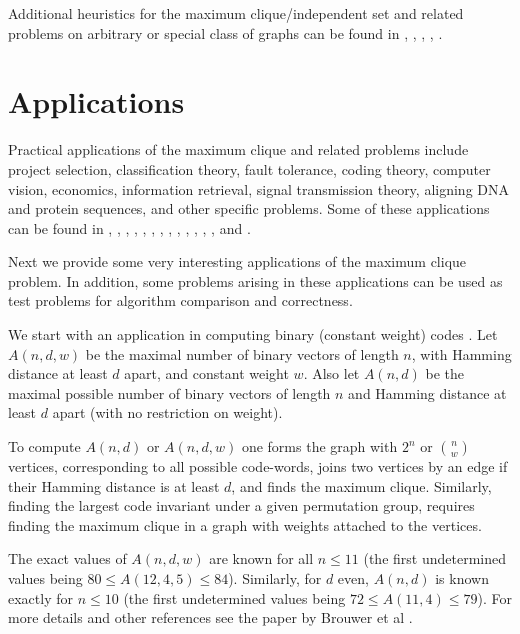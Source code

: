 Additional heuristics for the maximum clique/independent set and
related problems on arbitrary or special class of graphs can be
found in \cite{ChNiSa83}, \cite{ChNa91}, \cite{Chv79},
\cite{FiWo82}, \cite{TaChLeHu90}.

\section{Applications}

Practical applications of the maximum clique and related problems
include project selection, classification theory, fault tolerance,
coding theory, computer vision, economics, information retrieval,
signal transmission theory, aligning DNA and protein sequences,
and other specific problems. Some of these applications can be
found in \cite{Avo62}, \cite{BaBr82}, \cite{BaWeEp92},
\cite{BePe90}, \cite{Chr75}, \cite{Deo74}, \cite{LeMuAb89},
\cite{Lov79}, \cite{MaSl79}, \cite{Miller92}, \cite{ReNiDe77},
\cite{Slo89}, \cite{VinArg91}, \cite{VinArg92} and \cite{WiPiFe87}.

Next we provide some very interesting applications of the maximum
clique problem. In addition, some problems arising in these
applications can be used as test problems for algorithm comparison
and correctness. 


We start with an application in computing binary (constant weight)
codes \cite{BrShSlSm90}. Let $A(n,d,w)$ be the maximal number of
binary vectors of length $n$, with Hamming distance at least $d$
apart, and constant weight $w$. Also let $A(n,d)$ be the maximal
possible number of binary vectors of length $n$ and Hamming distance
at least $d$ apart (with no restriction on weight).

To compute $A(n,d)$ or $A(n,d,w)$ one forms the graph with $2^n$ or
${n\choose w}$ vertices, corresponding to all possible code-words,
joins two vertices by an edge if their Hamming distance is at least
$d$, and finds the maximum clique. Similarly, finding the largest
code invariant under a given permutation group, requires finding the
maximum clique in a graph with weights attached to the vertices.

The exact values of $A(n,d,w)$ are known for all $n \leq 11$ (the
first undetermined values being $80 \leq A(12,4,5) \leq 84$).
Similarly, for $d$ even, $A(n,d)$ is known exactly for $n \leq 10$
(the first undetermined values being $72 \leq A(11,4) \leq 79$). For
more details and other references see the paper by Brouwer et al
\cite{BrShSlSm90}.


